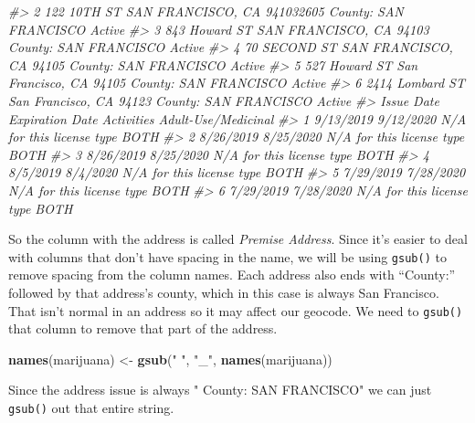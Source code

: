 \documentclass[
  12pt,
]{book}
\newenvironment{Shaded}{\begin{snugshade}}{\end{snugshade}}
\newcommand{\CommentTok}[1]{\textcolor[rgb]{0.37,0.37,0.37}{\textit{#1}}}
\newcommand{\KeywordTok}[1]{\textcolor[rgb]{0.27,0.27,0.27}{\textbf{#1}}}
\newcommand{\NormalTok}[1]{#1}
\newcommand{\OperatorTok}[1]{\textcolor[rgb]{0.43,0.43,0.43}{\textbf{#1}}}
\newcommand{\StringTok}[1]{\textcolor[rgb]{0.5,0.5,0.5}{#1}}
\begin{document}
\begin{Shaded}
\begin{Highlighting}[]
\CommentTok{\#\textgreater{} 2 122 10TH ST SAN FRANCISCO, CA 941032605 County: SAN FRANCISCO Active}
\CommentTok{\#\textgreater{} 3   843 Howard ST SAN FRANCISCO, CA 94103 County: SAN FRANCISCO Active}
\CommentTok{\#\textgreater{} 4    70 SECOND ST SAN FRANCISCO, CA 94105 County: SAN FRANCISCO Active}
\CommentTok{\#\textgreater{} 5   527 Howard ST San Francisco, CA 94105 County: SAN FRANCISCO Active}
\CommentTok{\#\textgreater{} 6 2414 Lombard ST San Francisco, CA 94123 County: SAN FRANCISCO Active}
\CommentTok{\#\textgreater{}   Issue Date Expiration Date                Activities Adult{-}Use/Medicinal}
\CommentTok{\#\textgreater{} 1  9/13/2019       9/12/2020 N/A for this license type                BOTH}
\CommentTok{\#\textgreater{} 2  8/26/2019       8/25/2020 N/A for this license type                BOTH}
\CommentTok{\#\textgreater{} 3  8/26/2019       8/25/2020 N/A for this license type                BOTH}
\CommentTok{\#\textgreater{} 4   8/5/2019        8/4/2020 N/A for this license type                BOTH}
\CommentTok{\#\textgreater{} 5  7/29/2019       7/28/2020 N/A for this license type                BOTH}
\CommentTok{\#\textgreater{} 6  7/29/2019       7/28/2020 N/A for this license type                BOTH}
\end{Highlighting}
\end{Shaded}

So the column with the address is called \emph{Premise Address}. Since it's easier to deal with columns that don't have spacing in the name, we will be using \texttt{gsub()} to remove spacing from the column names. Each address also ends with ``County:'' followed by that address's county, which in this case is always San Francisco. That isn't normal in an address so it may affect our geocode. We need to \texttt{gsub()} that column to remove that part of the address.

\begin{Shaded}
\begin{Highlighting}[]
\KeywordTok{names}\NormalTok{(marijuana) \textless{}{-}}\StringTok{ }\KeywordTok{gsub}\NormalTok{(}\StringTok{" "}\NormalTok{, }\StringTok{"\_"}\NormalTok{, }\KeywordTok{names}\NormalTok{(marijuana))}
\end{Highlighting}
\end{Shaded}

Since the address issue is always " County: SAN FRANCISCO" we can just \texttt{gsub()} out that entire string.

\begin{Shaded}
\end{Shaded}
\end{document}
